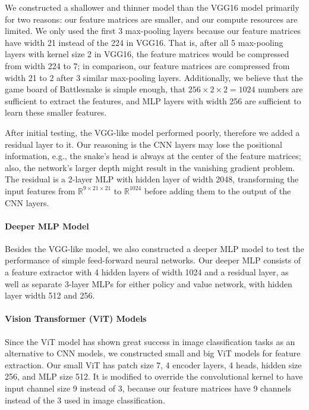 \documentclass[conference]{IEEEtran}
\begin{document}
We constructed a shallower and thinner model than the VGG16 model primarily for
two reasons: our feature matrices are smaller,
and our compute resources are limited.
We only used the first 3 max-pooling layers because our feature matrices have
width 21 instead of the 224 in VGG16. That is,
after all 5 max-pooling layers with kernel size 2 in VGG16,
the feature matrices would be compressed from width 224 to 7; in comparison,
our feature matrices are compressed from width 21 to 2 after 3 similar
max-pooling layers.
Additionally, we believe that the game board of Battlesnake is simple enough,
that $256\times 2\times 2=1024$ numbers are sufficient to extract the features,
and MLP layers with width 256 are sufficient to learn these smaller features.

After initial testing, the VGG-like model performed poorly,
therefore we added a residual layer to it.
Our reasoning is the CNN layers may lose the positional information,
e.g., the snake's head is always at the center of the feature matrices;
also, the network's larger depth might result in the vanishing gradient problem.
The residual is a 2-layer MLP with hidden layer of width 2048,
transforming the input features from $\mathbb R^{9\times 21\times 21}$ to
$\mathbb R^{1024}$ before adding them to the output of the CNN layers.

\paragraph{Deeper MLP Model}
Besides the VGG-like model,
we also constructed a deeper MLP model to test the performance of simple
feed-forward neural networks.
Our deeper MLP consists of a feature extractor with 4 hidden layers of width
1024 and a residual layer,
as well as separate 3-layer MLPs for either policy and value network,
with hidden layer width 512 and 256.

\paragraph{Vision Transformer (ViT) Models}
Since the ViT model has shown great success in image classification tasks as an
alternative to CNN models,
we constructed small and big ViT models for feature extraction.
Our small ViT has patch size 7, 4 encoder layers, 4 heads, hidden size 256,
and MLP size 512.
It is modified to override the convolutional kernel to have input channel size 9
instead of 3,
because our feature matrices have 9 channels instead of the 3 used in image
classification.
\end{document}
